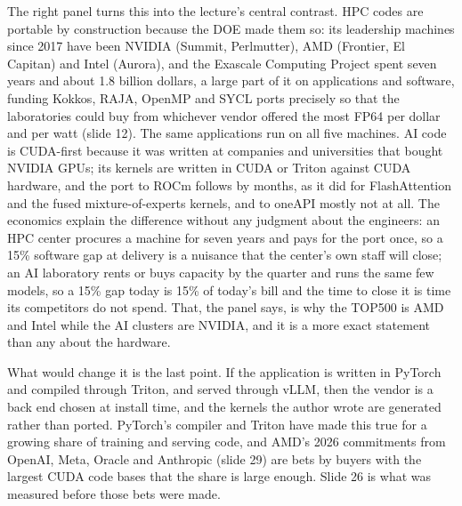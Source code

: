 \documentclass[11pt,letterpaper]{article}
\begin{document}
The right panel turns this into the lecture's central contrast. HPC codes are portable by construction because the DOE made them so: its leadership machines since 2017 have been NVIDIA (Summit, Perlmutter), AMD (Frontier, El Capitan) and Intel (Aurora), and the Exascale Computing Project spent seven years and about 1.8 billion dollars, a large part of it on applications and software, funding Kokkos, RAJA, OpenMP and SYCL ports precisely so that the laboratories could buy from whichever vendor offered the most FP64 per dollar and per watt (slide 12). The same applications run on all five machines. AI code is CUDA-first because it was written at companies and universities that bought NVIDIA GPUs; its kernels are written in CUDA or Triton against CUDA hardware, and the port to ROCm follows by months, as it did for FlashAttention and the fused mixture-of-experts kernels, and to oneAPI mostly not at all. The economics explain the difference without any judgment about the engineers: an HPC center procures a machine for seven years and pays for the port once, so a 15\% software gap at delivery is a nuisance that the center's own staff will close; an AI laboratory rents or buys capacity by the quarter and runs the same few models, so a 15\% gap today is 15\% of today's bill and the time to close it is time its competitors do not spend. That, the panel says, is why the TOP500 is AMD and Intel while the AI clusters are NVIDIA, and it is a more exact statement than any about the hardware.

What would change it is the last point. If the application is written in PyTorch and compiled through Triton, and served through vLLM, then the vendor is a back end chosen at install time, and the kernels the author wrote are generated rather than ported. PyTorch's compiler and Triton have made this true for a growing share of training and serving code, and AMD's 2026 commitments from OpenAI, Meta, Oracle and Anthropic (slide 29) are bets by buyers with the largest CUDA code bases that the share is large enough. Slide 26 is what was measured before those bets were made.
\end{document}
